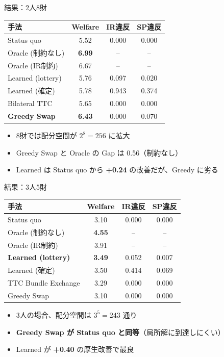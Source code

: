 \documentclass[aspectratio=169,12pt]{beamer}
\begin{document}
\begin{frame}{結果：2人8財}
\begin{table}[h]
\centering
\small
\begin{tabular}{lccc}
\toprule
手法 & Welfare & IR違反 & SP違反 \\
\midrule
Status quo & 5.52 & 0.000 & 0.000 \\
Oracle (制約なし) & \textbf{6.99} & -- & -- \\
Oracle (IR制約) & 6.67 & -- & -- \\
\midrule
Learned (lottery) & 5.76 & 0.097 & 0.020 \\
Learned (確定) & 5.78 & 0.943 & 0.374 \\
Bilateral TTC & 5.65 & 0.000 & 0.000 \\
\textbf{Greedy Swap} & \textbf{6.43} & 0.000 & 0.070 \\
\bottomrule
\end{tabular}
\end{table}

\vspace{0.3cm}
\begin{itemize}
    \item 8財では配分空間が $2^8 = 256$ に拡大
    \item Greedy Swap と Oracle の Gap は 0.56（制約なし）
    \item Learned は Status quo から \textbf{+0.24} の改善だが、Greedy に劣る
\end{itemize}
\end{frame}

\begin{frame}{結果：3人5財}
\begin{table}[h]
\centering
\small
\begin{tabular}{lccc}
\toprule
手法 & Welfare & IR違反 & SP違反 \\
\midrule
Status quo & 3.10 & 0.000 & 0.000 \\
Oracle (制約なし) & \textbf{4.55} & -- & -- \\
Oracle (IR制約) & 3.91 & -- & -- \\
\midrule
\textbf{Learned (lottery)} & \textbf{3.49} & 0.052 & 0.007 \\
Learned (確定) & 3.50 & 0.414 & 0.069 \\
TTC Bundle Exchange & 3.29 & 0.000 & 0.000 \\
Greedy Swap & 3.10 & 0.000 & 0.000 \\
\bottomrule
\end{tabular}
\end{table}

\vspace{0.3cm}
\begin{itemize}
    \item 3人の場合、配分空間は $3^5 = 243$ 通り
    \item \textbf{Greedy Swap が Status quo と同等}（局所解に到達しにくい）
    \item Learned が \textbf{+0.40} の厚生改善で最良
\end{itemize}
\end{frame}
\end{document}
